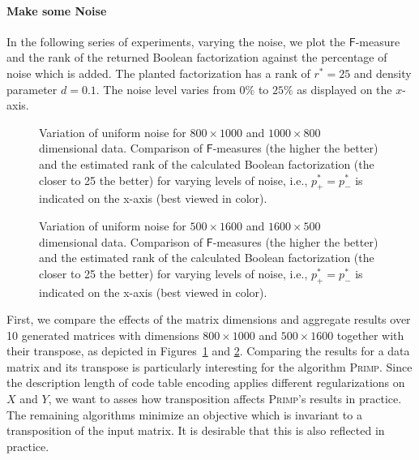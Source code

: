 \paragraph{Make some Noise}
In the following series of experiments, varying the noise, we plot the $\mathsf{F}$-measure and the rank of the returned Boolean factorization against the percentage of noise which is added. The planted factorization has a rank of $r^*=25$ and density parameter $d=0.1$. The noise level varies from $0\%$ to $25\%$ as displayed on the $x$-axis.  
\begin{figure}
\centering

\caption{Variation of uniform noise for $800\times 1000$ and $1000\times 800$ dimensional data. Comparison of $\mathsf{F}$-measures (the higher the better) and the estimated rank of the calculated Boolean factorization (the closer to 25 the better) for varying levels of noise, i.e., $p_+^*=p_-^*$ is indicated on the x-axis (best viewed in color).}
\label{fig:noise810}
\end{figure}
\begin{figure}
\centering

\caption{Variation of uniform noise for $500\times 1600$ and $1600\times 500$ dimensional data. Comparison of $\mathsf{F}$-measures (the higher the better) and the estimated rank of the calculated Boolean factorization (the closer to 25 the better) for varying levels of noise, i.e., $p_+^*=p_-^*$ is indicated on the x-axis (best viewed in color).}
\label{fig:noise516}
\end{figure}

First, we compare the effects of the matrix dimensions and aggregate results over 10 generated matrices with dimensions $800\times 1000$ and $500\times 1600$ together with their transpose, as depicted in Figures~\ref{fig:noise810} and \ref{fig:noise516}. Comparing the results for a data matrix and its transpose is particularly interesting for the algorithm \textsc{Primp}. Since the description length of code table encoding applies different regularizations on $X$ and $Y$, we want to asses how transposition affects \textsc{Primp}'s results in practice. The remaining algorithms minimize an objective which is invariant to a transposition of the input matrix. It is desirable that this is also reflected in practice.

